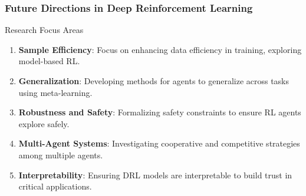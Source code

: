 \documentclass[aspectratio=169]{beamer}
\begin{document}
\begin{frame}[fragile]
    \frametitle{Future Directions in Deep Reinforcement Learning}

    \begin{block}{Research Focus Areas}
        \begin{enumerate}
            \item \textbf{Sample Efficiency}: Focus on enhancing data efficiency in training, exploring model-based RL.
            \item \textbf{Generalization}: Developing methods for agents to generalize across tasks using meta-learning.
            \item \textbf{Robustness and Safety}: Formalizing safety constraints to ensure RL agents explore safely.
            \item \textbf{Multi-Agent Systems}: Investigating cooperative and competitive strategies among multiple agents.
            \item \textbf{Interpretability}: Ensuring DRL models are interpretable to build trust in critical applications.
        \end{enumerate}
    \end{block}
\end{frame}
\end{document}
